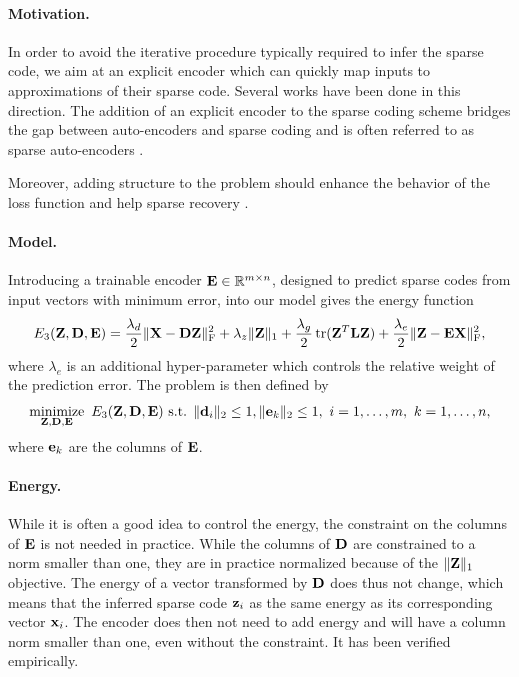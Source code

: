 \paragraph{Motivation.}
In order to avoid the iterative procedure typically required to infer the sparse code, we aim at an explicit encoder which can quickly map inputs to approximations of their sparse code. Several works \cite{lecun2010PSD, lecun2010LISTA, lecun2013DrSAE} have been done in this direction. The addition of an explicit encoder to the sparse coding scheme bridges the gap between auto-encoders and sparse coding and is often referred to as sparse auto-encoders \cite{bengio2009learningDeepAI}.

Moreover, adding structure to the problem should enhance the behavior of the loss function and help sparse recovery \cite{kowalski2009sparse, baraniuk2010modelCS, huang2011LearningStructuredSparsity, jenatton2011structured}.

\paragraph{Model.}
Introducing a trainable encoder $\mathbf{E} \in \mathbb{R}^{m \times n}$, designed to predict sparse codes from input vectors with minimum error, into our model gives the energy function
\begin{equation} \label{eqn:en_encoder}
	\Ethree = \frac{\lambda_d}{2} \normF{\X - \D \Z} + \lambda_z \normO{\Z} + \frac{\lambda_g}{2} \tr(\Z^T \L \Z) + \frac{\lambda_e}{2} \normF{\Z - \E \X}, %
\end{equation}
where $\lambda_e$ is an additional hyper-parameter which controls the relative weight of the prediction error. The problem is then defined by
\begin{equation} \label{eqn:pr_encoder}
	\operatorname*{minimize}\limits_{\mathbf{Z},\mathbf{D},\mathbf{E}} \  E_3(\mathbf{Z}, \mathbf{D}, \mathbf{E}) \text{ s.t. } \|\mathbf{d}_i\|_2 \leq 1 , \|\mathbf{e}_k\|_2 \leq 1 ,
	\ i = 1, \ldots, m , \ k = 1, \ldots, n,
\end{equation}
where $\mathbf{e}_k$ are the columns of $\mathbf{E}$. %

\paragraph{Energy.}
While it is often a good idea to control the energy, the constraint on the columns of $\mathbf{E}$ is not needed in practice. While the columns of $\mathbf{D}$ are constrained to a norm smaller than one, they are in practice normalized because of the $\| \mathbf{Z} \|_1$ objective. The energy of a vector transformed by $\mathbf{D}$ does thus not change, which means that the inferred sparse code $\mathbf{z}_i$ as the same energy as its corresponding vector $\mathbf{x}_i$. The encoder does then not need to add energy and will have a column norm smaller than one, even without the constraint. It has been verified empirically.


